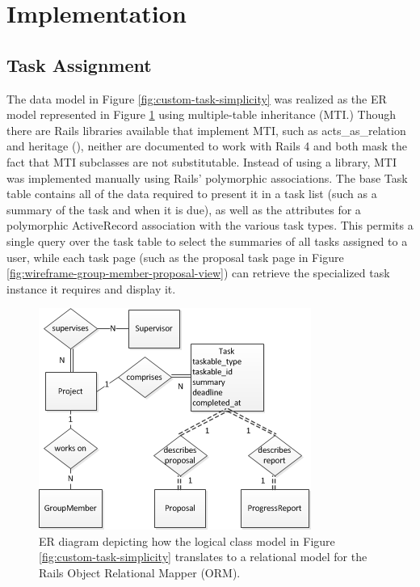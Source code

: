 \documentclass[document.tex]{subfiles}
\begin{document}
\section{Implementation}
\label{sec:4ys-implementation}


\subsection{Task Assignment}
The data model in Figure \ref{fig:custom-task-simplicity} was realized as the ER model represented in Figure \ref{fig:custom-task-er-model} using multiple-table inheritance (MTI.) Though there are Rails libraries available that implement MTI, such as acts\_as\_relation and heritage (), neither are documented to work with Rails 4 and both mask the fact that MTI subclasses are not substitutable. Instead of using a library, MTI was implemented manually using Rails’ polymorphic associations. The base Task table contains all of the data required to present it in a task list (such as a summary of the task and when it is due), as well as the attributes for a polymorphic ActiveRecord association with the various task types. This permits a single query over the task table to select the summaries of all tasks assigned to a user, while each task page (such as the proposal task page in Figure \ref{fig:wireframe-group-member-proposal-view}) can retrieve the specialized task instance it requires and display it.

\begin{figure}[!htbp]
\centering \includegraphics{./img/case-study-fourth-year-system/task-through-project-er-model}
\caption{ER diagram depicting how the logical class model in Figure \ref{fig:custom-task-simplicity} translates to a relational model for the Rails Object Relational Mapper (ORM).}
\label{fig:custom-task-er-model}
\end{figure}
\end{document}

